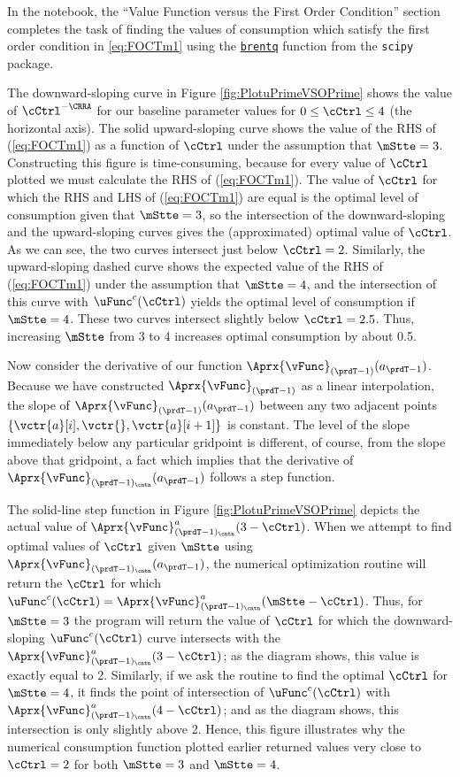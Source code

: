 \documentclass[\econtexRoot/SolvingMicroDSOPs]{subfiles}
\begin{document}
In the notebook, the ``Value Function versus the First Order Condition'' section completes the task of finding the values of consumption which satisfy the first order condition in \eqref{eq:FOCTm1} using the \href{https://docs.scipy.org/doc/scipy/reference/generated/scipy.optimize.brentq.html}{\texttt{brentq}} function from the \texttt{scipy} package.%


The downward-sloping curve in Figure \ref{fig:PlotuPrimeVSOPrime}
shows the value of $\cCtrl^{-\CRRA}$ for our baseline parameter values
for $0 \leq \cCtrl \leq 4$ (the horizontal axis).  The solid
upward-sloping curve shows the value of the RHS of (\ref{eq:FOCTm1})
as a function of $\cCtrl$ under the assumption that $\mStte=3$.
Constructing this figure is time-consuming, because for every
value of $\cCtrl$ plotted we must calculate the RHS of
(\ref{eq:FOCTm1}).  The value of $\cCtrl$ for which the RHS and LHS
of (\ref{eq:FOCTm1}) are equal is the optimal level of consumption
given that $\mStte=3$, so the intersection of the downward-sloping
and the upward-sloping curves gives the (approximated) optimal value of $\cCtrl$.
As we can see, the two curves intersect just below $\cCtrl=2$.
Similarly, the upward-sloping dashed curve shows the expected value
of the RHS of (\ref{eq:FOCTm1}) under the assumption that $\mStte=4$,
and the intersection of this curve with $\uFunc^{{c}}(\cCtrl)$ yields the
optimal level of consumption if $\mStte=4$.  These two curves
intersect slightly below $\cCtrl=2.5$.  Thus, increasing $\mStte$
from 3 to 4 increases optimal consumption by about 0.5.

Now consider the derivative of our function $\Aprx{\vFunc}_{({\prdT-1})}({a}_{\prdT-1})$.  Because we have
constructed $\Aprx{\vFunc}_{({\prdT-1})}$ as a linear interpolation, the slope of
$\Aprx{\vFunc}_{({\prdT-1})}({a}_{\prdT-1})$ between any two adjacent points
$\{\vctr{a}[i],\vctr{},\vctr{a}[{i+1}]\}$ is constant.  The level of the slope immediately below any
particular gridpoint is different, of course, from the slope above that gridpoint, a fact which
implies that the derivative of $\Aprx{\vFunc}_{({\prdT-1})_\cntn}({a}_{\prdT-1})$ follows a step function.

The solid-line step function in Figure \ref{fig:PlotuPrimeVSOPrime} depicts the actual value of
$\Aprx{\vFunc}_{({\prdT-1})_\cntn}^{{a}}(3-\cCtrl)$.  When we attempt to find optimal values of
$\cCtrl$ given $\mStte$ using $\Aprx{\vFunc}_{({\prdT-1})_\cntn}({a}_{\prdT-1})$, the numerical optimization routine will
return the $\cCtrl$ for which
$\uFunc^{{c}}(\cCtrl) = \Aprx{\vFunc}^{{a}}_{({\prdT-1})_\cntn}(\mStte-\cCtrl)$.  Thus, for
$\mStte=3$ the program will return the value of $\cCtrl$ for which the downward-sloping
$\uFunc^{{c}}(\cCtrl)$ curve intersects with the
$\Aprx{\vFunc}_{({\prdT-1})_\cntn}^{{a}}(3-\cCtrl)$; as the diagram shows, this value is exactly equal to 2.
Similarly, if we ask the routine to find the optimal $\cCtrl$ for $\mStte=4$, it finds the point of
intersection of $\uFunc^{{c}}(\cCtrl)$ with $\Aprx{\vFunc}_{({\prdT-1})_\cntn}^{{a}}(4-\cCtrl)$; and as the diagram shows, this
intersection is only slightly above 2.  Hence, this figure illustrates why the numerical consumption
function plotted earlier returned values very close to $\cCtrl=2$ for both $\mStte=3$ and $\mStte=4$.
\end{document}
